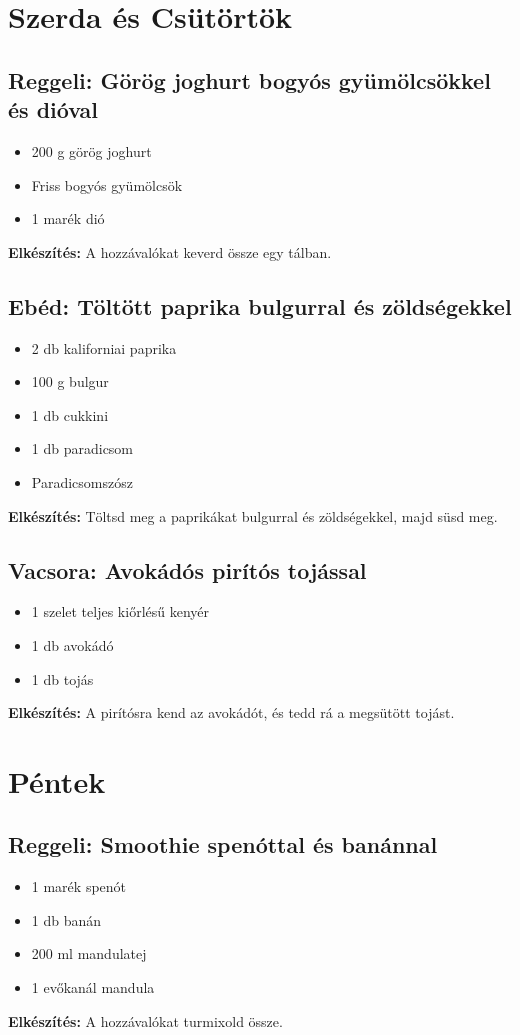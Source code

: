 \documentclass[a4paper,12pt]{article}
\begin{document}
\newpage

\section{Szerda és Csütörtök}
\subsection{Reggeli: Görög joghurt bogyós gyümölcsökkel és dióval}
\begin{itemize}
    \item 200 g görög joghurt
    \item Friss bogyós gyümölcsök
    \item 1 marék dió
\end{itemize}
\textbf{Elkészítés:} A hozzávalókat keverd össze egy tálban.

\subsection{Ebéd: Töltött paprika bulgurral és zöldségekkel}
\begin{itemize}
    \item 2 db kaliforniai paprika
    \item 100 g bulgur
    \item 1 db cukkini
    \item 1 db paradicsom
    \item Paradicsomszósz
\end{itemize}
\textbf{Elkészítés:} Töltsd meg a paprikákat bulgurral és zöldségekkel, majd süsd meg.

\subsection{Vacsora: Avokádós pirítós tojással}
\begin{itemize}
    \item 1 szelet teljes kiőrlésű kenyér
    \item 1 db avokádó
    \item 1 db tojás
\end{itemize}
\textbf{Elkészítés:} A pirítósra kend az avokádót, és tedd rá a megsütött tojást.

\newpage

\section{Péntek}
\subsection{Reggeli: Smoothie spenóttal és banánnal}
\begin{itemize}
    \item 1 marék spenót
    \item 1 db banán
    \item 200 ml mandulatej
    \item 1 evőkanál mandula
\end{itemize}
\textbf{Elkészítés:} A hozzávalókat turmixold össze.
\end{document}
